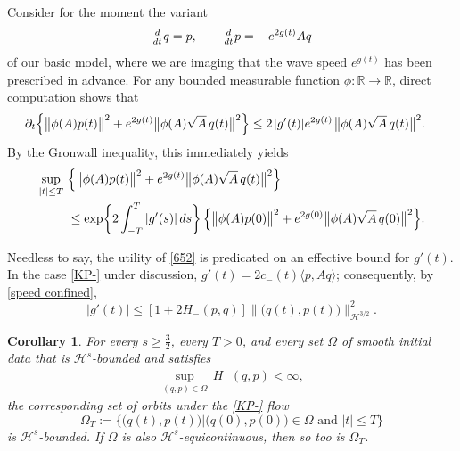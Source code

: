 \documentclass{amsart}
\newcommand{\R}{{\mathbb{R}}}
\newtheorem{corollary}[theorem]{Corollary}
\theoremstyle{definition}
\numberwithin{equation}{section}
\renewcommand{\H}{\mathcal H}
\begin{document}
Consider for the moment the variant 
\begin{equation}\label{650}
\tfrac{d}{dt}q  = p, \qquad \tfrac{d}{dt}p = - \mkern2mu e^{2g(t)} A q 
\end{equation}
of our basic model, where we are imaging that the wave speed $e^{g(t)}$ has been prescribed in advance.  For any bounded measurable function $\phi:\R\to\R$, direct computation shows that 
\begin{align*}%
\partial_t \Bigl\{ \bigl\| &\phi(A) p(t) \bigr\|^2 + e^{2g(t)} \bigl\| \phi(A) \sqrt{A}\, q(t) \bigr\|^2\Bigr\}
	\leq 2\mkern2mu|g'(t)| e^{2g(t)}\mkern2mu\bigl\| \phi(A) \sqrt{A}\, q(t) \bigr\|^2 .
\end{align*}
By the Gronwall inequality, this immediately yields
\begin{equation}\label{652}
\begin{aligned}
\sup_{|t|\leq T} \ &\Bigl\{ \bigl\| \phi(A) p(t) \bigr\|^2 + e^{2g(t)} \bigl\| \phi(A) \sqrt{A}\, q(t) \bigr\|^2\Bigr\} \\
	&\leq \exp\biggl\{ 2 \int_{-T}^T |g'(s)| \,ds \biggr\} \, \Bigl\{ \bigl\| \phi(A) p(0) \bigr\|^2 + e^{2g(0)} \bigl\| \phi(A) \sqrt{A}\, q(0) \bigr\|^2\Bigr\} .
\end{aligned}
\end{equation}

Needless to say, the utility of \eqref{652} is predicated on an effective bound for $g'(t)$.  In the case \eqref{KP-} under discussion, $ g'(t) = 2c_-(t) \langle p,A q \rangle$; consequently, by \eqref{speed confined},
\begin{equation}\label{653}
| g'(t) |  \leq [ 1 + 2H_{-}(p,q) ] \bigl\| \bigl(q(t),p(t)\bigr) \bigr\|_{\H^{3/2}}^2.
\end{equation}


\begin{corollary}\label{C:1.2}
For every $s\geq \frac32$, every $T>0$, and every set $\Omega$ of smooth initial data that is $\H^s$-bounded
and satisfies
\begin{align}\label{energy_-}
\sup_{(q,p) \in \Omega}\, H_-(q,p)<\infty,
\end{align}
the corresponding set of orbits under the \eqref{KP-} flow
\begin{equation}\label{C:1.2a}
 \Omega_T := \bigl\{ \bigl(q(t),p(t)\bigr) \big| \bigl(q(0),p(0)\bigr)\in\Omega \text{ and } |t|\leq T \bigr\}
\end{equation}
is $\H^s$-bounded.  If\/ $\Omega$ is also $\H^s$-equicontinuous, then so too is $\Omega_T$.
\end{corollary}
\end{document}
